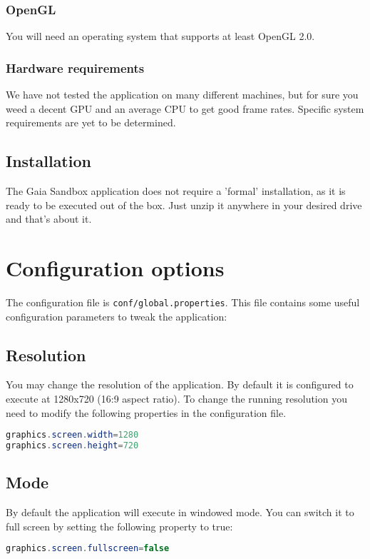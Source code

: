 \documentclass[
a4paper, %
11pt, %
onecolumn, %
openany, %
]{memoir}
\begin{document}
\subsection{OpenGL}
You will need an operating system that supports at least OpenGL 2.0.

\subsection{Hardware requirements}
We have not tested the application on many different
machines, but for sure you weed a decent GPU
and an average CPU to get good frame rates. Specific 
system requirements are yet to be determined.

\section{Installation}
The Gaia Sandbox application does not require a 'formal'
installation, as it is ready to be executed out of the
box. Just unzip it anywhere in your desired drive and
that's about it.

\chapter{Configuration options}\label{sec:config}
The configuration file is \texttt{conf/global.properties}. 
This file contains some useful configuration parameters 
to tweak the application:

\section{Resolution}
You may change the resolution of the application. By default it 
is configured to execute at 1280x720 (16:9 aspect ratio). To change
the running resolution you need to modify the following properties
in the configuration file.

\begin{lstlisting}[language=Java]
graphics.screen.width=1280
graphics.screen.height=720
\end{lstlisting}

\section{Mode}
By default the application will execute in windowed mode. You can
switch it to full screen by setting the following property to true:

\begin{lstlisting}[language=Java]
graphics.screen.fullscreen=false
\end{lstlisting}
\end{document}
